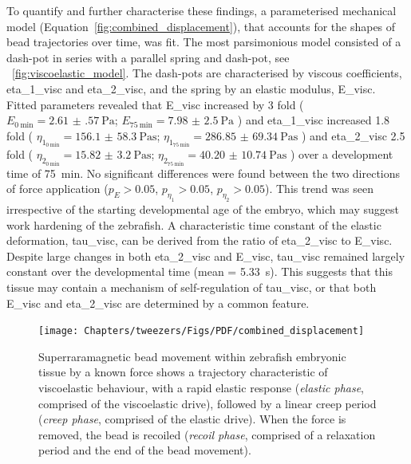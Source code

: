 To quantify and further characterise these findings, a parameterised mechanical model (Equation~\eqref{fig:combined_displacement}), that accounts for the shapes of bead trajectories over time, was fit.
The most parsimonious model consisted of a dash-pot in series with a parallel spring and dash-pot, see \figurename~\ref{fig:viscoelastic_model}.
The dash-pots are characterised by viscous coefficients, \gls{eta_1_visc} and \gls{eta_2_visc}, and the spring by an elastic modulus, \gls{E_visc}.
Fitted parameters revealed that \gls{E_visc} increased by 3 fold
(
\(E_{\SI{0}{\minute}}=\SI{2.61(57)}{\pascal}\);
\(E_{\SI{75}{\minute}}=\SI{7.98(250)}{\pascal}\)
)
and \gls{eta_1_visc} increased 1.8 fold
(
\(\eta_{1_{\SI{0}{\minute}}}=\SI{156.1(583)}{\pascal\second}\);
\(\eta_{1_{\SI{75}{\minute}}}=\SI{286.85(6934)}{\pascal\second}\)
)
and \gls{eta_2_visc} 2.5 fold
(
\(\eta_{2_{\SI{0}{\minute}}}=\SI{15.82(320)}{\pascal\second}\);
\(\eta_{2_{\SI{75}{\minute}}}=\SI{40.20(1074)}{\pascal\second}\)
)
over a development time of \SI{75}{\minute}.
No significant differences were found between the two directions of force application
(\(p_E > 0.05\), \(p_{\eta_1} > 0.05\), \(p_{\eta_2} > 0.05\)).
This trend was seen irrespective of the starting developmental age of the embryo, which may suggest work hardening of the \gls{zebrafish}. %
A characteristic time constant of the elastic deformation, \gls{tau_visc}, can be derived from the ratio of \gls{eta_2_visc} to \gls{E_visc}.
Despite large changes in both \gls{eta_2_visc} and \gls{E_visc}, \gls{tau_visc} remained largely constant over the developmental time (mean = \SI{5.33}{\second}).
This suggests that this tissue may contain a mechanism of self-regulation of \gls{tau_visc}, or that both \gls{E_visc} and \gls{eta_2_visc} are determined by a common feature.

\begin{figure}
 \centering
 \texttt{[image: Chapters/tweezers/Figs/PDF/combined\_displacement]}
 \caption{
 Superraramagnetic bead movement within \gls{zebrafish} embryonic tissue by a known force shows a trajectory characteristic of viscoelastic behaviour, with a rapid elastic response (\emph{elastic phase}, comprised of the viscoelastic drive), followed by a linear creep period (\emph{creep phase}, comprised of the elastic drive). When the force is removed, the bead is recoiled (\emph{recoil phase}, comprised of a relaxation period and the end of the bead movement).
 }\label{fig:combined_displacement}
\end{figure}

